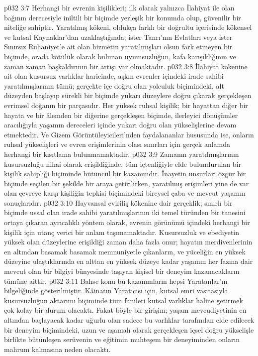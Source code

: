 \vs p032 3:7 Herhangi bir evrenin kişilikleri; ilk olarak yalnızca İlahiyat ile olan bağının derecesiyle iniltili bir biçimde yerleşik bir konumda olup, güvenilir bir niteliğe sahiptir. Yaratılmış kökeni, oldukça farklı bir doğrultu içerisinde kökensel ve kutsal Kaynaklar’dan uzaklaştığında; ister Tanrı’nın Evlatları veya ister Sınırsız Ruhaniyet’e ait olan hizmetin yaratılmışları olsun fark etmeyen bir biçimde, orada kötülük olarak bulunan uyumsuzluğun, kafa karışıklığının ve zaman zaman başkaldırının bir artışı var olmaktadır.
\vs p032 3:8 İlahiyat kökenine ait olan kusursuz varlıklar haricinde, aşkın evrenler içindeki irade sahibi yaratılmışlarının tümü; gerçekte içe doğru olan yolculuk biçimindeki, alt düzeyden başlayıp sürekli bir biçimde yukarı düzeylere doğru çıkarak gerçekleşen evrimsel doğanın bir parçasıdır. Her yüksek ruhsal kişilik; bir hayattan diğer bir hayata ve bir âlemden bir diğerine gerçekleşen biçimde, ilerleyici dönüşümler aracılığıyla yaşamın dereceleri içinde yukarı doğru olan yükselişlerine devam etmektedir. Ve Gizem Görüntüleyicileri’nden faydalananlar hususunda ise, onların ruhsal yükselişleri ve evren erişimlerinin olası sınırları için gerçek anlamda herhangi bir kısıtlama bulunmamaktadır.
\vs p032 3:9 Zamanın yaratılmışlarının kusursuzluğu nihai olarak erişildiğinde, tüm içtenliğiyle elde bulundurulan bir kişilik sahipliği biçiminde bütüncül bir kazanımdır. İnayetin unsurları özgür bir biçimde seçilen bir şekilde bir araya getirilirken, yaratılmış erişimleri yine de var olan çevreye karşı kişiliğin tepkisi biçimindeki bireysel çaba ve mevcut yaşamın sonuçlarıdır.
\vs p032 3:10 Hayvansal eviriliş kökenine dair gerçeklik; sınırlı bir biçimde ussal olan irade sahibi yaratılmışlarının iki temel türünden bir tanesini ortaya çıkaran ayrıcalıklı yöntem olarak, evrenin görünümü içindeki herhangi bir kişilik için utanç verici bir anlam taşımamaktadır. Kusursuzluk ve ebediyetin yüksek olan düzeylerine erişildiği zaman daha fazla onur; hayatın merdivenlerinin en altından basamak basamak memnuniyetle çıkanların, ve yüceliğin en yüksek düzeyine ulaştıklarında en alttan en yüksek düzeye kadar yaşamın her fazına dair mevcut olan bir bilgiyi bünyesinde taşıyan kişisel bir deneyim kazanacakların tümüne aittir.
\vs p032 3:11 Bahse konu bu kazanımların hepsi Yaratanlar’ın bilgeliğinde gösterilmiştir. Kâinatın Yaratıcısı için, kutsal emri vasıtasıyla kusursuzluğun aktarımı biçiminde tüm fanileri kutsal varlıklar haline getirmek çok kolay bir durum olacaktı. Fakat böyle bir girişim; yaşam mevcudiyetinin en altından başlayacak kadar uğurlu olan sadece bu varlıklar tarafından elde edilecek bir deneyim biçimindeki, uzun ve aşamalı olarak gerçekleşen içsel doğru yükselişle birlikte bütünleşen serüvenin ve eğitimin muhteşem bir deneyiminden onların mahrum kalmasına neden olacaktı.
